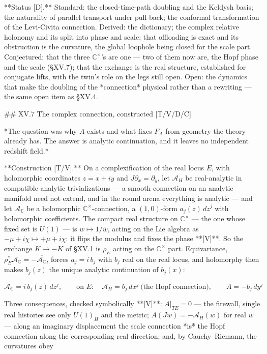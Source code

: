 **Status [D].** Standard: the closed-time-path doubling and the Keldysh basis; the naturality of parallel transport under pull-back; the conformal transformation of the Levi-Civita connection. Derived: the dictionary; the complex relative holonomy and its split into phase and scale; that offloading is exact and its obstruction is the curvature, the global loophole being closed for the scale part. Conjectured: that the three $\mathbb C^\times$'s are one — two of them now are, the Hopf phase and the scale (§XV.7); that the exchange is the real structure, established for conjugate lifts, with the twin's role on the legs still open. Open: the dynamics that make the doubling of the *connection* physical rather than a rewriting — the same open item as §XV.4.

## XV.7 The complex connection, constructed [T/V/D/C]

*The question was why $A$ exists and what fixes $F_A$ from geometry the theory already has. The answer is analytic continuation, and it leaves no independent redshift field.*

**Construction [T/V].** On a complexification of the real locus $E$, with holomorphic coordinates $z = x+iy$ and $J\partial_x = \partial_y$, let $\mathcal A_H$ be real-analytic in compatible analytic trivializations — a smooth connection on an analytic manifold need not extend, and in the round arena everything is analytic — and let $\mathcal A_{\mathbb C}$ be a holomorphic $\mathbb C^\times$-connection, a $(1,0)$-form $a_j(z)\,dz^j$ with holomorphic coefficients. The compact real structure on $\mathbb C^\times$ — the one whose fixed set is $U(1)$ — is $w\mapsto1/\bar w$, acting on the Lie algebra as $-\mu+i\chi\mapsto+\mu+i\chi$: it flips the modulus and fixes the phase **[V]**. So the exchange $K\to-K$ of §XV.1 is $\rho_E$ acting on the $\mathbb C^\times$ part. Equivariance, $\rho_E^*\mathcal A_{\mathbb C} = -\overline{\mathcal A_{\mathbb C} }$, forces $a_j = i\,b_j$ with $b_j$ real on the real locus, and holomorphy then makes $b_j(z)$ the unique analytic continuation of $b_j(x)$:

$$\mathcal A_{\mathbb C} = i\,b_j(z)\,dz^j,\qquad \text{on }E:\quad \mathcal A_H = b_j\,dx^j\ \text{(the Hopf connection)},\qquad A = -b_j\,dy^j$$

Three consequences, checked symbolically **[V]**: $A|_{TE} = 0$ — the firewall, single real histories see only $U(1)_H$ and the metric; $A(Jw) = -\mathcal A_H(w)$ for real $w$ — along an imaginary displacement the scale connection *is* the Hopf connection along the corresponding real direction; and, by Cauchy–Riemann, the curvatures obey

